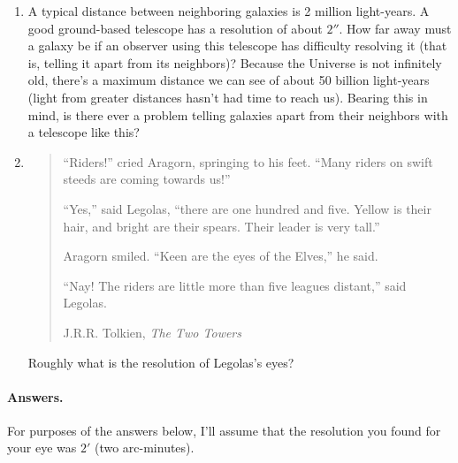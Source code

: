 \begin{enumerate}
\item A typical distance between neighboring galaxies is 2 million
light-years. A good ground-based telescope has a resolution of about $2''$.
How far away must a galaxy be if an observer using this telescope
has difficulty resolving it (that is, telling it apart from its
neighbors)? Because the Universe is not infinitely old, there's
a maximum distance we can see of about 50 billion light-years (light
from greater distances hasn't had time to reach us). Bearing this
in mind, is there ever a problem telling galaxies apart from their
neighbors with a telescope like this?

\item 
\begin{quote}
``Riders!'' cried Aragorn, springing to his feet. 
``Many riders on swift steeds are coming towards us!''

``Yes,'' said Legolas, ``there are one hundred and five. 
Yellow is their hair, and bright are their spears. Their leader is very tall.''

Aragorn smiled. ``Keen are the eyes of the Elves,'' he said.

``Nay! The riders are little more than five leagues distant,'' said Legolas.

{\hfill J.R.R. Tolkien, \textit{The Two Towers}}
\end{quote}

Roughly what is the resolution of Legolas's eyes? 


\end{enumerate}


\paragraph{Answers.} 

For purposes of the answers below, I'll assume that the resolution
you found for your eye was $2'$ (two arc-minutes). 

